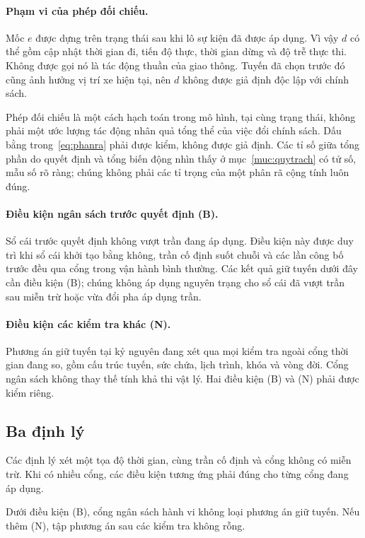 \paragraph{Phạm vi của phép đối chiếu.}
Mốc $e$ được dựng trên trạng thái sau khi lô sự kiện đã được áp dụng. Vì vậy $d$ có thể gồm
cập nhật thời gian đi, tiến độ thực, thời gian dừng và độ trễ thực thi. Không được gọi nó là
tác động thuần của giao thông. Tuyến đã chọn trước đó cũng ảnh hưởng vị trí xe hiện tại,
nên $d$ không được giả định độc lập với chính sách.

Phép đối chiếu là một cách hạch toán trong mô hình, tại cùng trạng thái, không phải một ước
lượng tác động nhân quả tổng thể của việc đổi chính sách. Dấu bằng trong~\eqref{eq:phanra}
phải được kiểm, không được giả định. Các tỉ số giữa tổng phần do quyết định và tổng biến
động nhìn thấy ở mục~\ref{muc:quytrach} có tử số, mẫu số rõ ràng; chúng không phải các tỉ
trọng của một phân rã cộng tính luôn đúng.

\paragraph{Điều kiện ngân sách trước quyết định (B).}
Sổ cái trước quyết định không vượt trần đang áp dụng. Điều kiện này được duy trì khi sổ cái
khởi tạo bằng không, trần cố định suốt chuỗi và các lần công bố trước đều qua cổng trong
vận hành bình thường. Các kết quả giữ tuyến dưới đây cần điều kiện (B); chúng không áp
dụng nguyên trạng cho sổ cái đã vượt trần sau miễn trừ hoặc vừa đổi pha áp dụng trần.

\paragraph{Điều kiện các kiểm tra khác (N).}
Phương án giữ tuyến tại kỷ nguyên đang xét qua mọi kiểm tra ngoài cổng thời gian đang so,
gồm cấu trúc tuyến, sức chứa, lịch trình, khóa và vòng đời. Cổng ngân sách không thay thế
tính khả thi vật lý. Hai điều kiện (B) và (N) phải được kiểm riêng.

\subsection{Ba định lý}


Các định lý xét một tọa độ thời gian, cùng trần cố định và cổng không có miễn trừ. Khi có
nhiều cổng, các điều kiện tương ứng phải đúng cho từng cổng đang áp dụng.

\begin{dinhly}

Dưới điều kiện (B), cổng ngân sách hành vi không loại phương án giữ tuyến. Nếu thêm (N),
tập phương án sau các kiểm tra không rỗng.
\end{dinhly}

